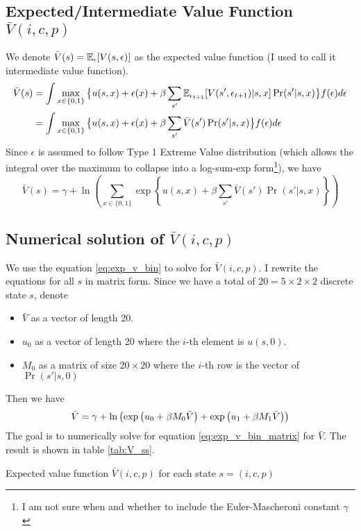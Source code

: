 \documentclass[12pt]{article}[margin=1in]
\begin{document}
\subsection{Expected/Intermediate Value Function $\bar{V}(i,c,p)$}
We denote $\bar{V}(s) = \mathbb{E}_{\epsilon}[V(s,\epsilon)]$ as the expected value function (I used to call it intermediate value function).
\begin{equation}\label{eq:exp_v}
    \begin{split}
        \bar{V}(s) & =\int \max_{x \in \{0,1\}} \big\{ u(s,x) + \epsilon(x)+ \beta \sum_{s'}\mathbb{E}_{\epsilon_{t+1}}[V(s',\epsilon_{t+1})|s,x] \Pr(s'|s,x)\big\}  f(\epsilon) d\epsilon \\
                   & =\int \max_{x \in \{0,1\}} \big\{ u(s,x) + \epsilon(x)+ \beta \sum_{s'}\bar{V}(s') \Pr(s'|s,x)\big\}  f(\epsilon) d\epsilon
    \end{split}
\end{equation}
Since $\epsilon$ is assumed to follow Type 1 Extreme Value distribution (which allows the integral over the maximum to collapse into a log-sum-exp form\footnote{I am not sure when and whether to include the Euler-Mascheroni constant $\gamma$}), we have
\begin{equation} \label{eq:exp_v_bin}
    \bar{V}(s) = \gamma+\ln\left(\sum_{x \in \{0,1\}} \exp\left\{ u(s,x) + \beta \sum_{s'}\bar{V}(s') \Pr(s'|s,x)\right\}\right)
\end{equation}

\subsection{Numerical solution of $\bar{V}(i,c,p)$}
We use the equation \ref{eq:exp_v_bin} to solve for $\bar{V}(i,c,p)$.  I rewrite the equations for all $s$ in matrix form. Since we have a total of $20=5\times 2\times 2$ discrete state $s$, denote
\begin{itemize}
    \item $\bar{V}$ as a vector of length 20.
    \item $u_0$ as a vector of length 20 where the $i$-th element is $u(s,0)$.
    \item $M_0$ as a matrix of size $20 \times 20$ where the $i$-th row is the vector of $\Pr(s'|s,0)$
\end{itemize}
Then we have
\begin{equation}\label{eq:exp_v_bin_matrix}
    \bar{V}= \gamma + \ln\left(\exp\left(u_0 + \beta M_0 \bar{V}\right) + \exp\left(u_1 + \beta M_1 \bar{V}\right)\right)
\end{equation}
The goal is to numerically solve for equation \ref{eq:exp_v_bin_matrix} for $\bar{V}$. The result is shown in table \ref{tab:V_ss}.
\newpage
\begin{table}
    \centering
    
    \caption{Expected value function $\bar{V}(i,c,p)$ for each state $s=(i,c,p)$}
    \label{tab:V_ss}
\end{table}
\newpage
\end{document}
